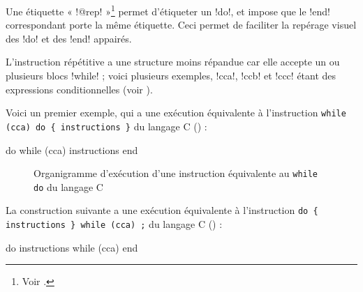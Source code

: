 Une étiquette « \pic!@rep! »\footnote{Voir .} permet d'étiqueter un \pic!do!, et impose que le \pic!end! correspondant porte la même étiquette. Ceci permet de faciliter la repérage visuel des  \pic!do! et des \pic!end! appairés.







L'instruction répétitive a une structure moins répandue car elle accepte un ou plusieurs blocs \pic!while! ; voici plusieurs exemples, \pic!cca!, \pic!ccb! et \pic!ccc! étant des expressions conditionnelles (voir ).


Voici un premier exemple, qui a une exécution équivalente à l'instruction \texttt{while (cca) do \{ instructions \}} du langage C () :
\begin{piccolo}
do
while (cca)
  instructions
end
\end{piccolo}

\begin{figure}[t]
  \centering
  \small
  \caption{Organigramme d'exécution d'une instruction équivalente au  \texttt{while} \texttt{do} du langage C}
  \ligne
\end{figure}

La construction suivante a une exécution équivalente à l'instruction \texttt{do \{ instructions \} while (cca) ;} du langage C () :
\begin{piccolo}
do
  instructions
while (cca)
end
\end{piccolo}

